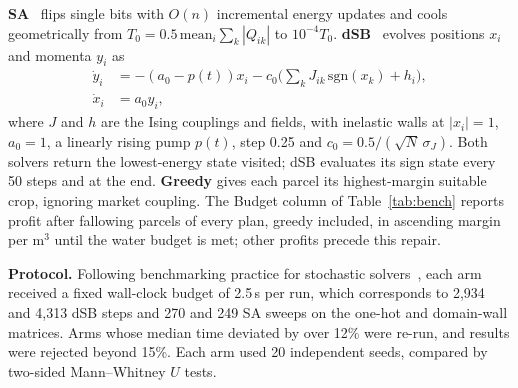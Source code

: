 \textbf{SA}~\cite{kirkpatrick1983} flips single bits with $O(n)$
incremental energy updates and cools geometrically from
$T_0 = 0.5\,\mathrm{mean}_i \sum_k |Q_{ik}|$ to $10^{-4}T_0$.
\textbf{dSB}~\cite{goto2021} evolves positions $x_i$ and momenta $y_i$ as
\begin{equation}
\begin{aligned}
\dot{y}_i &= -\left(a_0 - p(t)\right) x_i
- c_0 \Big( \sum_k J_{ik}\,\mathrm{sgn}(x_k) + h_i \Big),\\
\dot{x}_i &= a_0 y_i,
\end{aligned}
\label{eq:dsb}
\end{equation}
where $J$ and $h$ are the Ising couplings and fields, with inelastic walls
at $|x_i| = 1$, $a_0 = 1$, a linearly rising pump $p(t)$, step 0.25 and
$c_0 = 0.5/(\sqrt{N}\,\sigma_J)$. Both solvers return the lowest-energy
state visited; dSB evaluates its sign state every 50 steps and at the end.
\textbf{Greedy} gives each parcel its highest-margin suitable crop, ignoring
market coupling. The Budget column of Table~\ref{tab:bench} reports profit
after fallowing parcels of every plan, greedy included, in ascending margin
per m$^3$ until the water budget is met; other profits precede this repair.

\textbf{Protocol.} Following benchmarking practice for stochastic
solvers~\cite{beiranvand2017}, each arm received a fixed wall-clock budget
of 2.5\,s
per run, which corresponds to 2{,}934 and 4{,}313 dSB steps and 270 and 249
SA sweeps on the one-hot and domain-wall matrices. Arms whose median
time deviated by over 12\% were re-run, and results were rejected beyond
15\%. Each arm used 20 independent seeds, compared by two-sided
Mann--Whitney $U$ tests.
